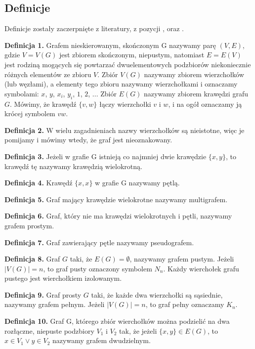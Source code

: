 \subsection{Definicje}
Definicje zostały zaczerpnięte z literatury, z pozycji \cite{Wilson2012}, \cite{Wloch2008} oraz \cite{Wojciechwoski2013}.

\noindent
\textbf{Definicja 1.}
Grafem nieskierowanym, skończonym G nazywamy parę $(V,E)$, gdzie $V = V(G)$ jest zbiorem skończonym, niepustym,
natomiast $E = E(V)$ jest rodziną mogących się powtarzać dwuelementowych podzbiorów niekoniecznie różnych elementów ze zbioru $V$.
Zbiór $V(G)$ nazywamy zbiorem wierzchołków (lub węzłami), a elementy tego zbioru nazywamy wierzchołkami i oznaczamy symbolami:
$x$, $y$, $x_i$, $y_i$, $1$, $2$, ... Zbiór $E(G)$ nazywamy zbiorem krawędzi grafu $G$.
Mówimy, że krawędź $\{v, w\}$ łączy wierzchołki $v$ i $w$, i na ogół oznaczamy ją krócej symbolem $vw$.

\noindent
\textbf{Definicja 2.}
W wielu zagadnieniach nazwy wierzchołków są nieistotne, więc je pomijamy i mówimy wtedy, że graf jest nieoznakowany.

\noindent
\textbf{Definicja 3.}
Jeżeli w grafie G istnieją co najmniej dwie krawędzie $\{x, y\}$, to krawędź tę nazywamy krawędzią wielokrotną.

\noindent
\textbf{Definicja 4.}
Krawędź $\{x, x\}$ w grafie G nazywamy pętlą.

\noindent
\textbf{Definicja 5.}
Graf mający krawędzie wielokrotne nazywamy multigrafem.

\noindent
\textbf{Definicja 6.}
Graf, który nie ma krawędzi wielokrotnych i pętli, nazywamy grafem prostym.

\noindent
\textbf{Definicja 7.}
Graf zawierający pętle nazywamy pseudografem.

\noindent
\textbf{Definicja 8.}
Graf $G$ taki, że $E(G) = \emptyset$, nazywamy grafem pustym. Jeżeli $|V(G)| = n$, to graf pusty oznaczony symbolem $N_n$.
Każdy wierchołek grafu pustego jest wierchołkiem izolowanym.

\noindent
\textbf{Definicja 9.}
Graf prosty $G$ taki, że każde dwa wierzchołki są sąsiednie, nazywamy grafem pełnym.
Jeżeli $|V(G)| = n$, to graf pełny oznaczamy $K_n$.

\noindent
\textbf{Definicja 10.}
Graf G, którego zbiór wierchołków można podzielić na dwa rozłączne, niepuste podzbiory $V_1$ i $V_2$ tak,
że jeżeli $\{x, y\} \in E(G)$, to $x \in V_1 \vee y \in V_2$ nazywamy grafem dwudzielnym.


